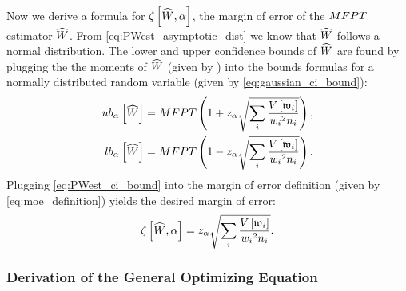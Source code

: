 Now we derive a formula for $\zeta \left[ \widehat{W}, \alpha \right]$, the margin of error of the $MFPT$ estimator $\widehat{W}$. From \eqref{eq:PWest_asymptotic_dist} we know that $\widehat{W}$ follows a normal distribution. The lower and upper confidence bounds of $\widehat{W}$ are found by plugging the the moments of $\widehat{W}$ (given by ) into the bounds formulas for a normally distributed random variable (given by \eqref{eq:gaussian_ci_bound}):
    \begin{align}
    \label{eq:PWest_ci_bound}
        \begin{split}
            ub_{\alpha} \left[ \widehat{W} \right] &= MFPT \left(1 + z_{\alpha} \sqrt{\sum_i \frac{V \left[ \mathfrak{w}_{i} \right]}{w_{i} {}^2 n_{i}}} \right), \\
            lb_{\alpha} \left[ \widehat{W} \right] &= MFPT \left(1 - z_{\alpha} \sqrt{\sum_i \frac{V \left[ \mathfrak{w}_{i} \right]}{w_{i} {}^2 n_{i}}} \right).
        \end{split}
    \end{align}
Plugging \eqref{eq:PWest_ci_bound} into the margin of error definition (given by \eqref{eq:moe_definition}) yields the desired margin of error:
    \begin{equation}
    \label{eq:product_estimator_zeta}
        \zeta \left[ \widehat{W}, \alpha \right] = z_{\alpha} \sqrt{\sum_i \frac{V \left[ \mathfrak{w}_{i} \right]}{w_{i} {}^2 n_i}}.
    \end{equation}

\subsubsection{Derivation of the General Optimizing Equation}

